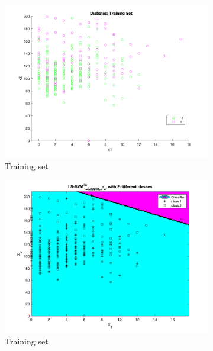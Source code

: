 \documentclass[a4paper, 11pt, one column]{article}
\begin{document}
\begin{figure}[hbt]
        \begin{subfigure}{0.45\linewidth}
            \includegraphics[width=\linewidth]{images/diabetes_training.png}
            \caption{Training set}
        \end{subfigure}
        \begin{subfigure}{0.45\linewidth}
            \includegraphics[width=\linewidth]{images/diabetes_linearkernel.png}
            \caption{Training set}
        \end{subfigure}
        \centering
        \begin{subfigure}{0.45\linewidth}

\end{subfigure}
\end{figure}
\end{document}
